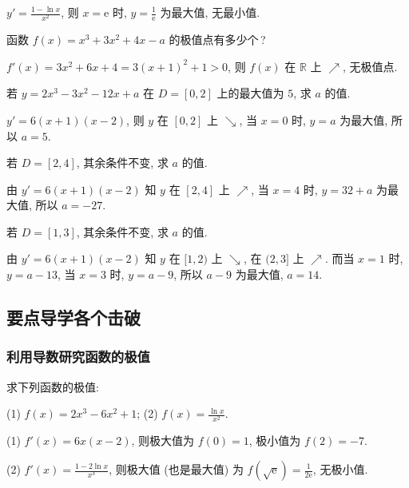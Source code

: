   \beginsolution
    $y'=\frac{1-\ln x}{x^2}$, 则 $x=\mathrm{e}$ 时, $y=\frac1{\mathrm{e}}$ 为最大值, 无最小值.
  \endsolution
  
  \begin{exercise}
    函数 $f(x)=x^3 +3x^2 +4x-a$ 的极值点有多少个\,?
  \end{exercise}

  \beginsolution
    $f'(x)=3x^2+6x+4=3(x+1)^2+1>0$, 则 $f(x)$ 在 $\mathbb{R}$ 上 $\nearrow$, 无极值点.
  \endsolution
  
  \begin{exercise}
    若 $y=2x^3 -3x^2 -12x+a$ 在 $D=[0,2]$ 上的最大值为 $5$, 求 $a$ 的值.
  \end{exercise}

  \beginsolution
    $y'=6(x+1)(x-2)$, 则 $y$ 在 $[0,2]$ 上 $\searrow$, 当 $x=0$ 时, $y=a$ 为最大值, 所以 $a=5$.
    
    \varexercise 若 $D=[2,4]$, 其余条件不变, 求 $a$ 的值.
    
    由 $y'=6(x+1)(x-2)$ 知 $y$ 在 $[2,4]$ 上 $\nearrow$, 当 $x=4$ 时, $y=32+a$ 为最大值, 所以 $a=-27$.
    
    \varexercise 若 $D=[1,3]$, 其余条件不变, 求 $a$ 的值.
    
    由 $y'=6(x+1)(x-2)$ 知 $y$ 在 $[1,2)$ 上 $\searrow$, 在 $(2,3]$ 上 $\nearrow$. 而当 $x=1$ 时, $y=a-13$, 当 $x=3$ 时, $y=a-9$, 所以 $a-9$ 为最大值, $a=14$.
  \endsolution
  
  \subsection{要点导学\quad 各个击破}
  \subsubsection{利用导数研究函数的极值}
  \begin{example}
    求下列函数的极值:
    
    (1) $f(x)=2x^3 -6x^2 +1$;\qquad
    (2) $f(x)=\frac{\ln x}{x^2}$.
  \end{example}

  \beginsolution
    (1) $f'(x)=6x(x-2)$, 则极大值为 $f(0)=1$, 极小值为 $f(2)=-7$.
    
    (2) $f'(x)=\frac{1-2\ln x}{x^3}$, 
    则极大值 (也是最大值) 为 $f(\sqrt{\mathrm{e}})=\frac1{2\mathrm{e}}$, 无极小值.
  \endsolution
  
